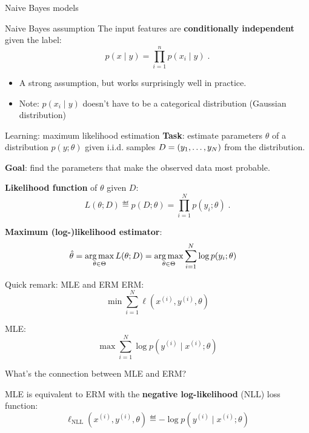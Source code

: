\documentclass[usenames,dvipsnames,notes,11pt,aspectratio=169]{beamer}
\newcommand{\pdfnote}[1]{}
\begin{document}
\begin{frame}
    {Naive Bayes models}
    \begin{block}
    {Naive Bayes assumption}
        The input features are \textbf{conditionally independent} given the label:
        $$
        p(x\mid y) = \prod_{i=1}^n p(x_i\mid y) \;.
        $$
    \end{block}
    \begin{itemize}
        \item A strong assumption, but works surprisingly well in practice.

        \item Note: $p(x_i\mid y)$ doesn't have to be a categorical distribution (\eg Gaussian distribution)
    \end{itemize}

\end{frame}

\begin{frame}
    {Learning: maximum likelihood estimation}
    \textbf{Task}: estimate parameters $\theta$ of a distribution $p(y; \theta)$ given i.i.d. samples $D=\left( y_1, \ldots, y_N \right)$ from the distribution.

    \medskip
    \textbf{Goal}: find the parameters that make the observed data most probable.

    \medskip\pause
    \textbf{Likelihood function} of $\theta$ given $D$:
    $$
    L(\theta; D) \eqdef p(D;\theta) = \prod_{i=1}^N p(y_i; \theta) \;.
    $$

    \textbf{Maximum (log-)likelihood estimator}:
    \begin{align}
        \hat{\theta} &= \operatorname*{arg\,max}_{\theta\in\Theta} L(\theta; D)
        = \operatorname*{arg\,max}_{\theta\in\Theta} \sum_{i=1}^N \log p(y_i; \theta)
    \end{align}

    \pdfnote{To make ``most probable'' more precise, we define the likelihood function of the parameters to be the probability of the data given by the model.}
    \pdfnote{Why can we write the joint distribution as the product? Independent assumption from iid.}
    \pdfnote{Now it's reduced to an optimization problem.}
\end{frame}

\begin{frame}
    {Quick remark: MLE and ERM}
    ERM:
    $$
    \min \sum_{i=1}^N \ell(x^{(i)}, y^{(i)}, \theta)
    $$
    \pause

    MLE:
    $$
    \max \sum_{i=1}^N \log p(y^{(i)} \mid x^{(i)}; \theta)
    $$
    \pause

    What's the connection between MLE and ERM?

    \medskip
    MLE is equivalent to ERM with the \textbf{negative log-likelihood} (NLL) loss function:
    $$
    \ell_{\text{NLL}}(x^{(i)}, y^{(i)}, \theta) \eqdef -\log p(y^{(i)} \mid x^{(i)}; \theta)
    $$
\end{frame}
\end{document}
